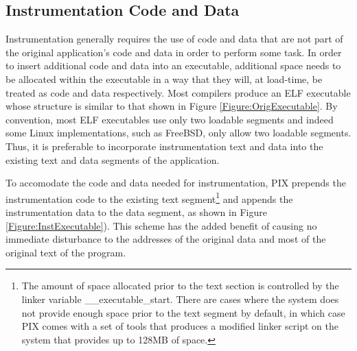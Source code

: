 \subsection{Instrumentation Code and Data}

Instrumentation generally requires the use of code and data that are not part of the original
application's code and data in order to perform some task. In order to insert additional code
and data into an executable, additional space needs to be allocated within the executable in a way that they
will, at load-time, be treated as code and data respectively. Most compilers produce an ELF executable whose
structure is similar to that shown in Figure \ref{Figure:OrigExecutable}. By
convention, most ELF executables use only two loadable segments and indeed some Linux
implementations, such as FreeBSD, only allow two loadable segments. Thus, it is
preferable to incorporate instrumentation text and data into the
existing text and data segments of the application. 

To accomodate the code and data needed for instrumentation, PIX prepends the instrumentation code to the existing text
segment\footnote{The amount of space allocated prior to the text section is
controlled by the linker variable \_\_executable\_start. There are cases
where the system does not provide enough space prior to the text segment by
default, in which case PIX comes with a set of tools that produces a modified linker
script on the system that provides up to 128MB of space.} and appends the instrumentation data to the
data segment, as shown in Figure \ref{Figure:InstExecutable}). This
scheme has the added benefit of causing no immediate disturbance to the
addresses of the original data and most of the original text of the program.

